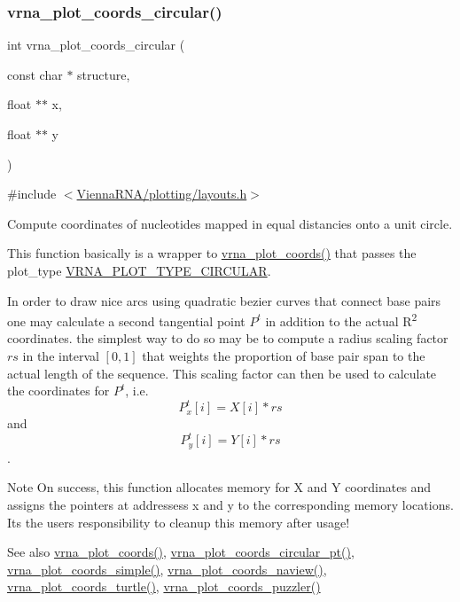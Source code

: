 \subsubsection{\texorpdfstring{vrna\_plot\_coords\_circular()}{vrna\_plot\_coords\_circular()}}
{\footnotesize\ttfamily int vrna\+\_\+plot\+\_\+coords\+\_\+circular (\begin{DoxyParamCaption}\item[{const char $\ast$}]{structure,  }\item[{float $\ast$$\ast$}]{x,  }\item[{float $\ast$$\ast$}]{y }\end{DoxyParamCaption})}



{\ttfamily \#include $<$\mbox{\hyperlink{layouts_8h}{Vienna\+R\+N\+A/plotting/layouts.\+h}}$>$}



Compute coordinates of nucleotides mapped in equal distancies onto a unit circle. 

This function basically is a wrapper to \mbox{\hyperlink{group__plot__layout__utils_ga2e2adbef0283a8ff2dfe5284eb1f4a6a}{vrna\+\_\+plot\+\_\+coords()}} that passes the {\ttfamily plot\+\_\+type} \mbox{\hyperlink{group__plot__layout__utils_ga8c9eac631348da92136c8363ecdd9fb9}{V\+R\+N\+A\+\_\+\+P\+L\+O\+T\+\_\+\+T\+Y\+P\+E\+\_\+\+C\+I\+R\+C\+U\+L\+AR}}.

In order to draw nice arcs using quadratic bezier curves that connect base pairs one may calculate a second tangential point $P^t$ in addition to the actual R\textsuperscript{2} coordinates. the simplest way to do so may be to compute a radius scaling factor $rs$ in the interval $[0,1]$ that weights the proportion of base pair span to the actual length of the sequence. This scaling factor can then be used to calculate the coordinates for $P^t$, i.\+e. \[ P^{t}_x[i] = X[i] * rs \] and \[ P^{t}_y[i] = Y[i] * rs \].

\begin{DoxyNote}{Note}
On success, this function allocates memory for X and Y coordinates and assigns the pointers at addressess {\ttfamily x} and {\ttfamily y} to the corresponding memory locations. It\textquotesingle{}s the users responsibility to cleanup this memory after usage!
\end{DoxyNote}
\begin{DoxySeeAlso}{See also}
\mbox{\hyperlink{group__plot__layout__utils_ga2e2adbef0283a8ff2dfe5284eb1f4a6a}{vrna\+\_\+plot\+\_\+coords()}}, \mbox{\hyperlink{group__plot__layout__utils_gaeec80faa235f3ca489bc5e50adc41460}{vrna\+\_\+plot\+\_\+coords\+\_\+circular\+\_\+pt()}}, \mbox{\hyperlink{group__plot__layout__utils_gaea0dada4d0113d16d4890bc0937292e6}{vrna\+\_\+plot\+\_\+coords\+\_\+simple()}}, \mbox{\hyperlink{group__plot__layout__utils_gac0335e398d01202c77c1d7b28811b761}{vrna\+\_\+plot\+\_\+coords\+\_\+naview()}}, \mbox{\hyperlink{group__plot__layout__utils_ga195139110e2877b92c7f82d05b6dad19}{vrna\+\_\+plot\+\_\+coords\+\_\+turtle()}}, \mbox{\hyperlink{group__plot__layout__utils_gafd49896df8780c9669125429bc0da9b3}{vrna\+\_\+plot\+\_\+coords\+\_\+puzzler()}}
\end{DoxySeeAlso}

